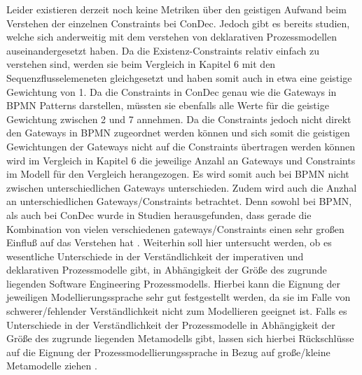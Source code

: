 Leider existieren derzeit noch keine Metriken über den geistigen Aufwand beim Verstehen der einzelnen Constraints bei ConDec. Jedoch gibt es bereits studien, welche sich anderweitig mit dem verstehen von deklarativen Prozessmodellen auseinandergesetzt haben. Da die Existenz-Constraints relativ einfach zu verstehen sind, werden sie beim Vergleich in Kapitel 6 mit den Sequenzflusselemeneten gleichgesetzt und haben somit auch in etwa eine geistige Gewichtung von 1. Da die Constraints in ConDec genau wie die Gateways in BPMN Patterns darstellen, müssten sie ebenfalls alle Werte für die geistige Gewichtung zwischen 2 und 7 annehmen. Da die Constraints jedoch nicht direkt den Gateways in BPMN zugeordnet werden können und sich somit die geistigen Gewichtungen der Gateways nicht auf die Constraints übertragen werden können wird im Vergleich in Kapitel 6 die jeweilige Anzahl an Gateways und Constraints im Modell für den Vergleich herangezogen. Es wird somit auch bei BPMN nicht zwischen unterschiedlichen Gateways unterschieden. Zudem wird auch die Anzhal an unterschiedlichen Gateways/Constraints betrachtet. Denn sowohl bei BPMN, als auch bei ConDec wurde in Studien herausgefunden, dass gerade die Kombination von vielen verschiedenen gateways/Constraints einen sehr großen Einfluß auf das Verstehen hat \cite{gruhn2006adopting, thesis_maja,haisjackl2014understanding}. \newline
Weiterhin soll hier untersucht werden, ob es wesentliche Unterschiede in der Verständlichkeit der imperativen und deklarativen Prozessmodelle gibt, in Abhängigkeit der Größe des zugrunde liegenden Software Engineering Prozessmodells. Hierbei kann die Eignung der jeweiligen Modellierungssprache sehr gut festgestellt werden, da sie im Falle von schwerer/fehlender Verständlichkeit nicht zum Modellieren geeignet ist. Falls es Unterschiede in der Verständlichkeit der Prozessmodelle in Abhängigkeit der Größe des zugrunde liegenden Metamodells gibt, lassen sich hierbei Rückschlüsse auf die Eignung der Prozessmodellierungssprache in Bezug auf große/kleine Metamodelle ziehen \cite{leimeister2012,journals95, freund2007,reinshagen2009, becker2012prozessmanagement,koch2011,bpm07,thesis_maja}.


